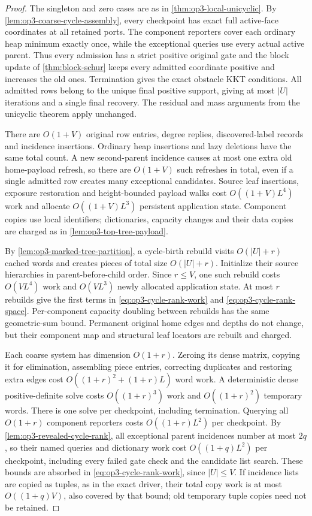 \begin{proof}
The singleton and zero cases are as in \cref{thm:op3-local-unicyclic}.
By \cref{lem:op3-coarse-cycle-assembly}, every checkpoint has exact full
active-face coordinates at all retained ports. The component reporters
cover each ordinary heap minimum exactly once, while the exceptional
queries use every actual active parent. Thus every admission has a strict
positive original gate and the block update of \cref{thm:block-schur}
keeps every admitted coordinate positive and increases the old ones.
Termination gives the exact obstacle KKT conditions. All admitted rows
belong to the unique final positive support, giving at most $|U|$ iterations
and a single final recovery. The residual and mass arguments from the
unicyclic theorem apply unchanged.

There are $O(1+V)$ original row entries, degree replies, discovered-label
records and incidence insertions. Ordinary heap insertions and lazy
deletions have the same total count. A new second-parent incidence causes
at most one extra old home-payload refresh, so there are $O(1+V)$ such
refreshes in total, even if a single admitted row creates many exceptional
candidates. Source leaf insertions, exposure restoration and height-bounded
payload walks cost $O((1+V)L^4)$ work and allocate $O((1+V)L^3)$ persistent
application state. Component copies use local identifiers; dictionaries,
capacity changes and their data copies are charged as in
\cref{lem:op3-top-tree-payload}.

By \cref{lem:op3-marked-tree-partition}, a cycle-birth rebuild visits
$O(|U|+r)$ cached words and creates pieces of total size $O(|U|+r)$.
Initialize their source hierarchies in parent-before-child order. Since
$r\leq V$, one such rebuild costs $O(VL^4)$ work and $O(VL^3)$ newly
allocated application state. At most $r$ rebuilds give the first terms in
\eqref{eq:op3-cycle-rank-work} and \eqref{eq:op3-cycle-rank-space}.
Per-component capacity doubling between rebuilds has the same geometric-sum
bound. Permanent original home edges and depths do not change, but their
component map and structural leaf locators are rebuilt and charged.

Each coarse system has dimension $O(1+r)$. Zeroing its dense matrix, copying
it for elimination, assembling piece entries, correcting duplicates and
restoring extra edges cost $O((1+r)^2+(1+r)L)$ word work. A deterministic
dense positive-definite solve costs $O((1+r)^3)$ work and $O((1+r)^2)$
temporary words. There is one solve per checkpoint, including termination.
Querying all $O(1+r)$ component reporters costs $O((1+r)L^2)$ per checkpoint.
By \cref{lem:op3-revealed-cycle-rank}, all exceptional parent incidences
number at most $2q$, so their named queries and dictionary work cost
$O((1+q)L^2)$ per checkpoint, including every failed gate check and the
candidate list search. These bounds are absorbed in
\eqref{eq:op3-cycle-rank-work}, since $|U|\leq V$.
If incidence lists are copied as tuples, as in the exact driver, their total
copy work is at most $O((1+q)V)$, also covered by that bound; old temporary
tuple copies need not be retained.


\end{proof}
